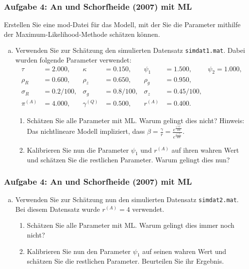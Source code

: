 \documentclass{beamer} %
\newcounter{saveenumi}
\newcommand{\seti}{\setcounter{saveenumi}{\value{enumi}}}
\newcommand{\conti}{\setcounter{enumi}{\value{saveenumi}}}
\begin{document}
\begin{frame}\frametitle{Aufgabe 4: An und Schorfheide (2007) mit ML}
Erstellen Sie eine mod-Datei für das Modell, mit der Sie die Parameter mithilfe der Maximum-Likelihood-Methode schätzen können.
  \begin{enumerate}[(a)]
    \item Verwenden Sie zur Schätzung den simulierten Datensatz \texttt{simdat1.mat}. Dabei wurden folgende Parameter verwendet:
   \begin{align*}
          \tau&=2.000,&	\kappa&=0.150, &\psi_1 &=1.500,	&\psi_2=1.000,\\
          \rho_R&=0.600,	&\rho_z &=0.650,& \rho_g&=0.950, \\
          \sigma_R&=0.2/100, &\sigma_g&=0.8/100 ,&	\sigma_z&=0.45/100 ,\\
           \pi^{(A)}&=4.000, &\gamma^{(Q)}&=0.500, &r^{(A)}&=0.400.
    \end{align*}
    \begin{enumerate}
    \item Schätzen Sie alle Parameter mit ML. Warum gelingt dies nicht? Hinweis: Das nichtlineare Modell impliziert, dass $\beta=\frac{\gamma}{r}=\frac{e^{\frac{\gamma^{(Q)}}{100}}}{e^{\frac{r^{(A)}}{400}}}$.
    \item Kalibrieren Sie nun die Parameter $\psi_1$ und $r^{(A)}$ auf ihren wahren Wert und schätzen Sie die restlichen Parameter. Warum gelingt dies nun?
  \end{enumerate}\seti
  \end{enumerate}
\end{frame}

\begin{frame}\frametitle{Aufgabe 4: An und Schorfheide (2007) mit ML}
    \begin{enumerate}[(a)]\conti
    \item Verwenden Sie zur Schätzung nun den simulierten Datensatz \texttt{simdat2.mat}. Bei diesem Datensatz wurde $r^{(A)}=4$ verwendet.
    \begin{enumerate}
      \item Schätzen Sie alle Parameter mit ML. Warum gelingt dies immer noch nicht?
      \item Kalibrieren Sie nun den Parameter $\psi_1$ auf seinen wahren Wert und schätzen Sie die restlichen Parameter. Beurteilen Sie ihr Ergebnis.
    \end{enumerate}
    \end{enumerate}
\end{frame}
\end{document}
